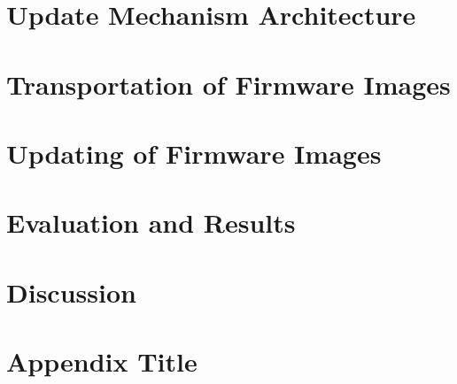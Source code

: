 \documentclass{kththesis}
\begin{document}
\chapter{Update Mechanism Architecture}


\chapter{Transportation of Firmware Images}

\chapter{Updating of Firmware Images}


\chapter{Evaluation and Results}


\chapter{Discussion}


\printbibliography[heading=bibintoc] %

\appendix

\chapter{Appendix Title}
\end{document}
